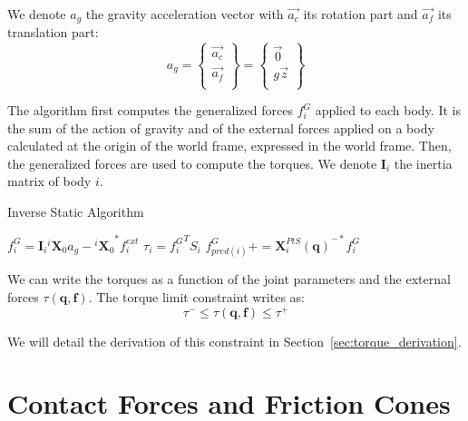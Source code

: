 We denote $a_g$ the gravity acceleration vector with $\vec{a_c}$ its rotation part and $\vec{a_f}$ its translation part:
\begin{equation}
  a_g = \left\{ \begin{array}{r}
    \vec{a_c} \\
    \vec{a_f} \\
  \end{array} \right\}
  = \left\{ \begin{array}{r}
    \vec{0} \\
    g\vec{z}\\
  \end{array} \right\}
\end{equation}

The algorithm first computes the generalized forces $f^G_i$ applied to each body.
It is the sum of the action of gravity and of the external forces applied on a body calculated at the origin of the world frame, expressed in the world frame.
Then, the generalized forces are used to compute the torques.
We denote $\mathbf{I}_i$ the inertia matrix of body $i$.

\begin{algorithm}
  \caption{Inverse Static Algorithm}
\label{alg:IS}
\begin{algorithmic}
  \State$f^G_i = \mathbf{I}_i {}^i\mathbf{X}_0 a_g - {{}^i\mathbf{X}_0}^*f_i^{ext}$
  \EndFor{}
  \State$\tau_i = {f^G_i}^T S_i$
  \State$f^G_{pred(i)} += {\mathbf{X}^{PtS}_i(\mathbf{q})}^{-*} f^G_i$
  \EndIf{}
  \EndFor{}
\end{algorithmic}
\end{algorithm}

We can write the torques as a function of the joint parameters and the external forces $\tau(\mathbf{q},\mathbf{f})$.
The torque limit constraint writes as:
\begin{equation}
  \boxed{\tau^- \leq \tau(\mathbf{q},\mathbf{f}) \leq \tau^+}
\end{equation}

We will detail the derivation of this constraint in Section~\ref{sec:torque_derivation}.


\section{Contact Forces and Friction Cones}
\label{sec:contact_forces_and_friction_cones}


